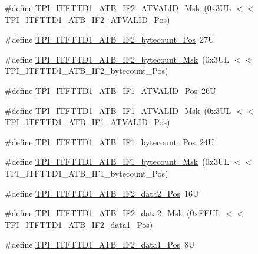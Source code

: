 \begin{DoxyCompactItemize}
\item 
\#define \hyperlink{group___c_m_s_i_s___t_p_i_gab90afcecec23b0a84f60858a4becf101}{T\+P\+I\+\_\+\+I\+T\+F\+T\+T\+D1\+\_\+\+A\+T\+B\+\_\+\+I\+F2\+\_\+\+A\+T\+V\+A\+L\+I\+D\+\_\+\+Msk}~(0x3\+U\+L $<$$<$ T\+P\+I\+\_\+\+I\+T\+F\+T\+T\+D1\+\_\+\+A\+T\+B\+\_\+\+I\+F2\+\_\+\+A\+T\+V\+A\+L\+I\+D\+\_\+\+Pos)
\item 
\#define \hyperlink{group___c_m_s_i_s___t_p_i_ga1faf942e53403e99b720cd9bd337834b}{T\+P\+I\+\_\+\+I\+T\+F\+T\+T\+D1\+\_\+\+A\+T\+B\+\_\+\+I\+F2\+\_\+bytecount\+\_\+\+Pos}~27U
\item 
\#define \hyperlink{group___c_m_s_i_s___t_p_i_gaffb4994b50708823e386c789893a70a7}{T\+P\+I\+\_\+\+I\+T\+F\+T\+T\+D1\+\_\+\+A\+T\+B\+\_\+\+I\+F2\+\_\+bytecount\+\_\+\+Msk}~(0x3\+U\+L $<$$<$ T\+P\+I\+\_\+\+I\+T\+F\+T\+T\+D1\+\_\+\+A\+T\+B\+\_\+\+I\+F2\+\_\+bytecount\+\_\+\+Pos)
\item 
\#define \hyperlink{group___c_m_s_i_s___t_p_i_ga044de2a0de2700dbf131484f4ed6e7a0}{T\+P\+I\+\_\+\+I\+T\+F\+T\+T\+D1\+\_\+\+A\+T\+B\+\_\+\+I\+F1\+\_\+\+A\+T\+V\+A\+L\+I\+D\+\_\+\+Pos}~26U
\item 
\#define \hyperlink{group___c_m_s_i_s___t_p_i_ga3ab94563c20fa37ed1335cfba7b8cc77}{T\+P\+I\+\_\+\+I\+T\+F\+T\+T\+D1\+\_\+\+A\+T\+B\+\_\+\+I\+F1\+\_\+\+A\+T\+V\+A\+L\+I\+D\+\_\+\+Msk}~(0x3\+U\+L $<$$<$ T\+P\+I\+\_\+\+I\+T\+F\+T\+T\+D1\+\_\+\+A\+T\+B\+\_\+\+I\+F1\+\_\+\+A\+T\+V\+A\+L\+I\+D\+\_\+\+Pos)
\item 
\#define \hyperlink{group___c_m_s_i_s___t_p_i_ga6c7aeeb290b4fcc9ef6dc0915987434e}{T\+P\+I\+\_\+\+I\+T\+F\+T\+T\+D1\+\_\+\+A\+T\+B\+\_\+\+I\+F1\+\_\+bytecount\+\_\+\+Pos}~24U
\item 
\#define \hyperlink{group___c_m_s_i_s___t_p_i_gae732ca50dcfc0d2d951480ac77300fa9}{T\+P\+I\+\_\+\+I\+T\+F\+T\+T\+D1\+\_\+\+A\+T\+B\+\_\+\+I\+F1\+\_\+bytecount\+\_\+\+Msk}~(0x3\+U\+L $<$$<$ T\+P\+I\+\_\+\+I\+T\+F\+T\+T\+D1\+\_\+\+A\+T\+B\+\_\+\+I\+F1\+\_\+bytecount\+\_\+\+Pos)
\item 
\#define \hyperlink{group___c_m_s_i_s___t_p_i_ga795919f12700ccafc14122cf023f8ff3}{T\+P\+I\+\_\+\+I\+T\+F\+T\+T\+D1\+\_\+\+A\+T\+B\+\_\+\+I\+F2\+\_\+data2\+\_\+\+Pos}~16U
\item 
\#define \hyperlink{group___c_m_s_i_s___t_p_i_ga284ac1fccc1eed973d38ddba209ee04a}{T\+P\+I\+\_\+\+I\+T\+F\+T\+T\+D1\+\_\+\+A\+T\+B\+\_\+\+I\+F2\+\_\+data2\+\_\+\+Msk}~(0x\+F\+F\+U\+L $<$$<$ T\+P\+I\+\_\+\+I\+T\+F\+T\+T\+D1\+\_\+\+A\+T\+B\+\_\+\+I\+F2\+\_\+data1\+\_\+\+Pos)
\item 
\#define \hyperlink{group___c_m_s_i_s___t_p_i_ga1a6cd0ad1a353a2f59ad86f7a3506d67}{T\+P\+I\+\_\+\+I\+T\+F\+T\+T\+D1\+\_\+\+A\+T\+B\+\_\+\+I\+F2\+\_\+data1\+\_\+\+Pos}~8U
$$
\end{DoxyCompactItemize}
